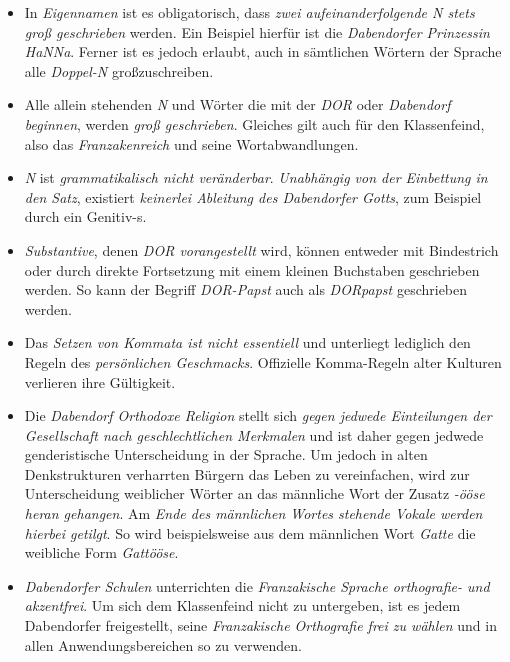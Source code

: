 \begin{itemize}
\item In \textit{Eigennamen} ist es obligatorisch, dass \textit{zwei aufeinanderfolgende \textit{N} stets groß geschrieben} werden. Ein Beispiel hierfür ist die \textit{Dabendorfer Prinzessin HaNNa}. Ferner ist es jedoch erlaubt, auch in sämtlichen Wörtern der Sprache alle \textit{Doppel-N} großzuschreiben.
\item Alle allein stehenden \textit{N} und Wörter die mit der \textit{DOR} oder \textit{Dabendorf beginnen}, werden \textit{groß geschrieben}. Gleiches gilt auch für den Klassenfeind, also das \textit{Franzakenreich} und seine Wortabwandlungen.
\item \textit{N} ist \textit{grammatikalisch nicht veränderbar}. \textit{Unabhängig von der Einbettung in den Satz}, existiert \textit{keinerlei Ableitung des Dabendorfer Gotts}, zum Beispiel durch ein Genitiv-s.
\item \textit{Substantive}, denen \textit{DOR vorangestellt} wird, können entweder mit Bindestrich oder durch direkte Fortsetzung mit einem kleinen Buchstaben geschrieben werden. So kann der Begriff \textit{DOR-Papst} auch als \textit{DORpapst} geschrieben werden.
\item Das \textit{Setzen von Kommata ist nicht essentiell} und unterliegt lediglich den Regeln des \textit{persönlichen Geschmacks}. Offizielle Komma-Regeln alter Kulturen verlieren ihre Gültigkeit.
\item Die \textit{Dabendorf Orthodoxe Religion} stellt sich \textit{gegen jedwede Einteilungen der Gesellschaft nach geschlechtlichen Merkmalen} und ist daher gegen jedwede genderistische Unterscheidung in der Sprache. Um jedoch in alten Denkstrukturen verharrten Bürgern das Leben zu vereinfachen, wird zur Unterscheidung weiblicher Wörter an das männliche Wort der Zusatz \textit{-ööse heran gehangen}. Am \textit{Ende des männlichen Wortes stehende Vokale werden hierbei getilgt}. So wird beispielsweise aus dem männlichen Wort \textit{Gatte} die weibliche Form \textit{Gattööse}.
\item \textit{Dabendorfer Schulen} unterrichten die \textit{Franzakische Sprache orthografie- und akzentfrei}. Um sich dem Klassenfeind nicht zu untergeben, ist es jedem Dabendorfer freigestellt, seine \textit{Franzakische Orthografie frei zu wählen} und in allen Anwendungsbereichen so zu verwenden.
\end{itemize}

